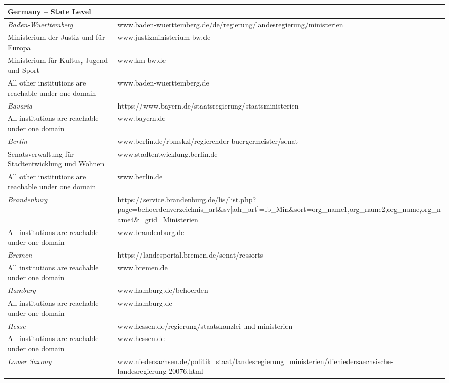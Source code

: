 \begin{spacing}{.5}
\begin{longtable}{ p{} p{}}
\hline
\hline
\textbf{Germany – State Level}\\
\hline
\textit{Baden-Wuerttemberg} & www.baden-wuerttemberg.de/de/regierung/\newline landesregierung/ministerien \\
Ministerium der Justiz und für Europa & www.justizministerium-bw.de \\
Ministerium für Kultus, Jugend und Sport & www.km-bw.de\\
All other institutions are reachable under one domain & www.baden-wuerttemberg.de\\
\hline
\textit{Bavaria} & https://www.bayern.de/staatsregierung/\newline staatsministerien \\
All institutions are reachable under one domain & www.bayern.de \\
\hline
\textit{Berlin} & www.berlin.de/rbmskzl/regierender-buergermeister/senat \\
Senatsverwaltung für Stadtentwicklung und Wohnen &	www.stadtentwicklung.berlin.de \\
All other institutions are reachable under one domain &	www.berlin.de \\
\hline
\textit{Brandenburg} & https://service.brandenburg.de/lis/list.php?\newline page=behoerdenverzeichnis\_art\&sv[adr\_art]=\newline lb\_Min\&sort=org\_name1,org\_name2,org\_name\newline 3,org\_name4\&\_grid=Ministerien \\
All institutions are reachable under one domain & www.brandenburg.de \\
\hline
\textit{Bremen} & https://landesportal.bremen.de/senat/ressorts \\
All institutions are reachable under one domain & www.bremen.de \\
\hline
\textit{Hamburg} & www.hamburg.de/behoerden \\
All institutions are reachable under one domain & www.hamburg.de \\
\hline
\textit{Hesse} & www.hessen.de/regierung/staatskanzlei-und-ministerien \\
All institutions are reachable under one domain & www.hessen.de \\
\hline
\textit{Lower Saxony} & www.niedersachsen.de/politik\_staat/\newline landesregierung\_ministerien/die\-niedersaechsische-landesregierung-20076.html \\

\end{longtable}
\end{spacing}
